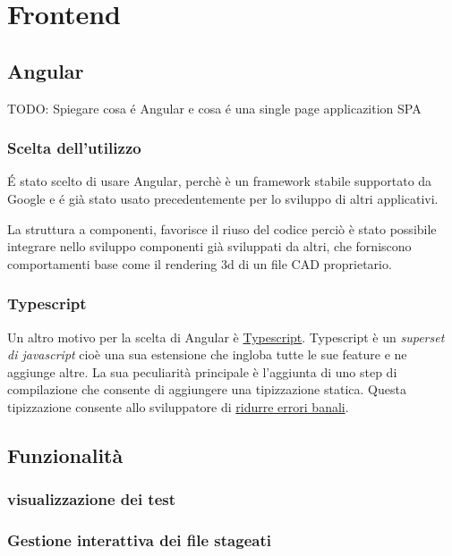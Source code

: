 \chapter{Frontend}
    \section{Angular}
        TODO: Spiegare cosa \'e Angular e cosa \'e una single page applicazition SPA
        \subsection{Scelta dell'utilizzo}
            \'E stato scelto di usare Angular, perchè è un framework stabile supportato da Google
            e \'e già stato usato precedentemente per lo sviluppo di altri applicativi.
            
            La struttura a componenti, favorisce il riuso del codice perciò è stato possibile integrare
            nello sviluppo componenti già sviluppati da altri, che forniscono comportamenti base
            come il rendering 3d di un file CAD proprietario.
        
        \subsection{Typescript}
            Un altro motivo per la scelta di Angular è \href{https://www.typescriptlang.org}{Typescript}.
            Typescript è un \textit{superset di javascript} cioè una sua estensione che ingloba tutte le sue feature e ne aggiunge altre.
            La sua peculiarità principale è l'aggiunta di uno step di compilazione che consente di aggiungere una tipizzazione statica.
            Questa tipizzazione consente allo sviluppatore di
            \href{https://www.quora.com/Why-is-type-checking-important-in-programming-languages-and-how-should-one-choose-between-dynamically-and-statically-typed-languages}{ridurre errori banali}.
    \section{Funzionalità}
        \subsection{visualizzazione dei test}         
        \subsection{Gestione interattiva dei file stageati}         
